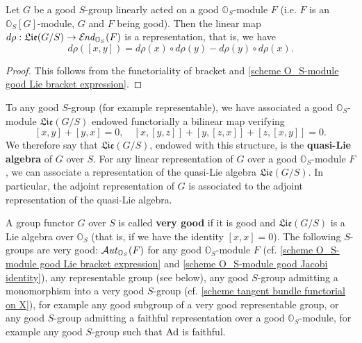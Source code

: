 \begin{corollary}\label{scheme O_S-module good representation induced}
Let $G$ be a good $S$-group linearly acted on a good $\mathbb{O}_S$-module $F$ (i.e. $F$ is an $\mathbb{O}_S[G]$-module, $G$ and $F$ being good). Then the linear map $d\rho:\mathfrak{Lie}(G/S)\to\operatorname{\mathcal{E}\hspace*{-1pt}\textit{nd}\hspace{0.5pt}}_{\mathbb{O}_S}(F)$ is a representation, that is, we have
\[d\rho([x,y])=d\rho(x)\circ d\rho(y)-d\rho(y)\circ d\rho(x).\]
\end{corollary}
\begin{proof}
This follows from the functoriality of bracket and \cref{scheme O_S-module good Lie bracket expression}.
\end{proof}

To any good $S$-group (for example representable), we have associated a good $\mathbb{O}_S$-module $\mathfrak{Lie}(G/S)$ endowed functorially a bilinear map verifying
\[[x,y]+[y,x]=0,\quad [x,[y,z]]+[y,[z,x]]+[z,[x,y]]=0.\]
We therefore say that $\mathfrak{Lie}(G/S)$, endowed with this structure, is the \textbf{quasi-Lie algebra} of $G$ over $S$. For any linear representation of $G$ over a good $\mathbb{O}_S$-module $F$, we can associate a representation of the quasi-Lie algebra $\mathfrak{Lie}(G/S)$. In particular, the adjoint representation of $G$ is associated to the adjoint representation of the quasi-Lie algebra.\par

A group functor $G$ over $S$ is called \textbf{very good} if it is good and $\mathfrak{Lie}(G/S)$ is a Lie algebra over $\mathbb{O}_S$ (that is, if we have the identity $[x,x]=0$). The following $S$-groups are very good: $\operatorname{\mathcal{A}\hspace*{-0.2pt}\textit{ut}\hspace{0.5pt}}_{\mathbb{O}_S}(F)$ for any good $\mathbb{O}_S$-module $F$ (cf. \cref{scheme O_S-module good Lie bracket expression} and \cref{scheme O_S-module good Jacobi identity}), any representable group (see below), any good $S$-group admitting a monomorphism into a very good $S$-group (cf. \cref{scheme tangent bundle functorial on X}), for example any good subgroup of a very good representable group, or any good $S$-group admitting a faithful representation over a good $\mathbb{O}_S$-module, for example any good $S$-group such that $\mathrm{Ad}$ is faithful.\par

